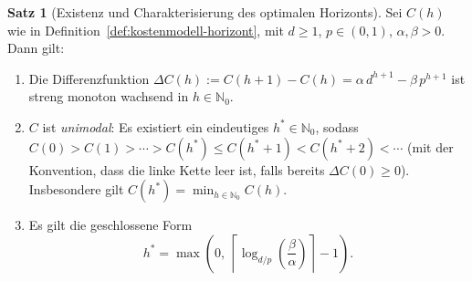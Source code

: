 ﻿\documentclass[a4paper,12pt]{article}
\theoremstyle{definition}
\newtheorem{satz}{Satz}
\begin{document}
\begin{satz}[Existenz und Charakterisierung des optimalen Horizonts]
	\label{satz:optimaler-horizont}
	Sei $C(h)$ wie in Definition~\ref{def:kostenmodell-horizont}, mit $d\ge1$,
	$p\in(0,1)$, $\alpha,\beta>0$. Dann gilt:
	\begin{enumerate}
		\item[(a)] Die Differenzfunktion $\Delta C(h):=C(h+1)-C(h)=\alpha\,d^{h+1} -
		\beta\,p^{h+1}$ ist streng monoton wachsend in $h\in\mathbb{N}_0$.
		\item[(b)] $C$ ist \emph{unimodal}: Es existiert ein eindeutiges
		$h^\ast\in\mathbb{N}_0$, sodass $C(0)>C(1)>\cdots>C(h^\ast)\le
		C(h^\ast+1)<C(h^\ast+2)<\cdots$ (mit der Konvention, dass die linke Kette leer
		ist, falls bereits $\Delta C(0)\ge0$). Insbesondere gilt
		$C(h^\ast)=\min_{h\in\mathbb{N}_0}C(h)$.
		\item[(c)] Es gilt die geschlossene Form
		\[
			h^\ast = \max\!\left(0,\ \left\lceil \log_{d/p}\!\left(\frac{\beta}{\alpha}\right)
			\right\rceil - 1\right).
		\]
	\end{enumerate}
\end{satz}
\end{document}
